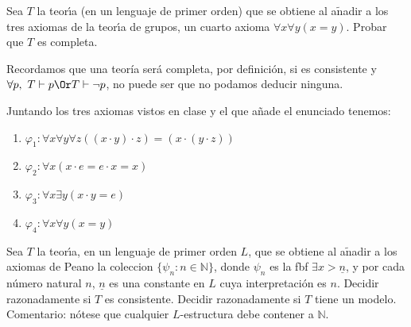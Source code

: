 \begin{problem} 
Sea $T$ la teor\'{\i}a (en un lenguaje de primer orden) 
que se obtiene al a$\operatorname{\tilde{n}}$adir a los tres axiomas de la teor\'{\i}a de  grupos,
un cuarto axioma $\forall x\forall y (x = y)$. Probar que $T$ es completa.
\solution

Recordamos que una teoría será completa, por definición, si es consistente y $\forall p, \ T \vdash p \Or T\vdash \neg p$, no puede ser que no podamos deducir ninguna.

Juntando los tres axiomas vistos en clase y el que añade el enunciado tenemos:
\begin{enumerate}
\item $\varphi_1: \forall x\forall y\forall z ((x\cdot y)\cdot z) = (x\cdot(y\cdot z))$
\item $\varphi_2: \forall x(x\cdot e = e\cdot x = x)$
\item $\varphi_3: \forall x\exists y (x\cdot y = e)$
\item $\varphi_4: \forall x\forall y (x=y)$
\end{enumerate}



\end{problem}

\begin{problem} Sea $T$ la teor\'{\i}a, 
 en un lenguaje de primer orden  $L$, que se obtiene al a$\operatorname{\tilde{n}}$adir a los
axiomas de Peano la coleccion $\{ \psi_n: n\in\mathbb{N}\}$, donde
$\psi_n$ es la fbf $\exists x > \underline{n}$,  y  por cada n\'umero natural $n$,  $ \underline{n}$ es una constante
en $L$ cuya interpretaci\'on es $n$.
 Decidir razonadamente si 
$T$ es consistente. Decidir razonadamente si $T$ tiene un modelo. Comentario: n\'otese que  cualquier
$L$-estructura debe contener a $\mathbb{N}$.
\solution

\end{problem}